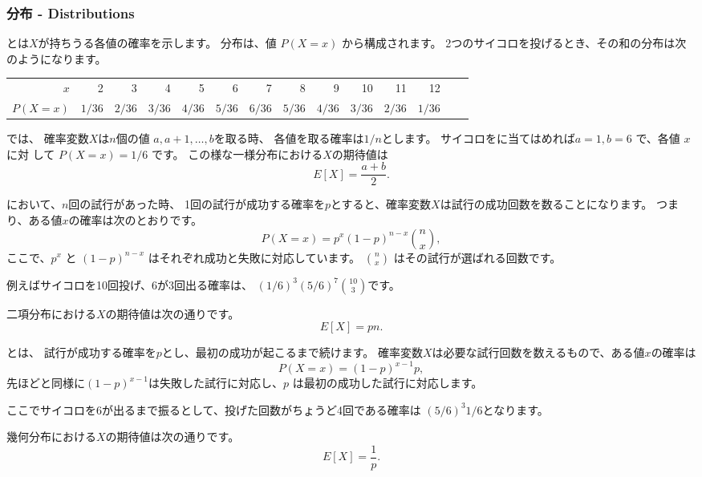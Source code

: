 \subsubsection{分布 - Distributions}


とは$X$が持ちうる各値の確率を示します。
分布は、値 $P(X=x)$ から構成されます。
2つのサイコロを投げるとき、その和の分布は次のようになります。

\begin{center}
\small {
\begin{tabular}{r|rrrrrrrrrrrrr}
$x$ & 2 & 3 & 4 & 5 & 6 & 7 & 8 & 9 & 10 & 11 & 12 \\
$P(X=x)$ & $1/36$ & $2/36$ & $3/36$ & $4/36$ & $5/36$ & $6/36$ & $5/36$ & $4/36$ & $3/36$ & $2/36$ & $1/36$ \\
\end{tabular}
}
\end{center}

では、
確率変数$X$は$n$個の値 $a,a+1,\ldots,b$を取る時、
各値を取る確率は$1/n$とします。
サイコロをに当てはめれば$a = 1, b = 6$ で、各値 $x$ に対 して $P(X = x) = 1/6$ です。
この様な一様分布における$X$の期待値は
\[E[X] = \frac{a+b}{2}.\]

において、$n$回の試行があった時、
1回の試行が成功する確率を$p$とすると、確率変数$X$は試行の成功回数を数ることになります。
つまり、ある値$x$の確率は次のとおりです。
\[P(X=x)=p^x (1-p)^{n-x} {n \choose x},\]
ここで、$p^x$ と $(1-p)^{n-x}$ はそれぞれ成功と失敗に対応しています。
${n \choose x}$ はその試行が選ばれる回数です。

例えばサイコロを10回投げ、6が3回出る確率は、
$(1/6)^3 (5/6)^7 {10 \choose 3}$です。

二項分布における$X$の期待値は次の通りです。
\[E[X] = pn.\]

とは、
試行が成功する確率を$p$とし、最初の成功が起こるまで続けます。
確率変数$X$は必要な試行回数を数えるもので、ある値$x$の確率は
\[P(X=x)=(1-p)^{x-1} p,\]
先ほどと同様に$(1-p)^{x-1}$は失敗した試行に対応し、$p$ は最初の成功した試行に対応します。

ここでサイコロを6が出るまで振るとして、投げた回数がちょうど4回である確率は
$(5/6)^3 1/6$となります。

幾何分布における$X$の期待値は次の通りです。
\[E[X]=\frac{1}{p}.\]

